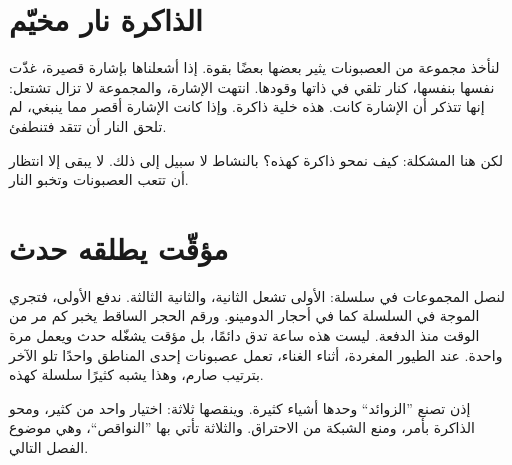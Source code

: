 \section*{الذاكرة نار مخيّم}

لنأخذ مجموعة من العصبونات يثير بعضها بعضًا بقوة. إذا أشعلناها بإشارة قصيرة، غذّت نفسها بنفسها، كنار تلقي في ذاتها وقودها. انتهت الإشارة، والمجموعة لا تزال تشتعل: إنها تتذكر أن الإشارة كانت. هذه خلية ذاكرة. وإذا كانت الإشارة أقصر مما ينبغي، لم تلحق النار أن تتقد فتنطفئ.

لكن هنا المشكلة: كيف نمحو ذاكرة كهذه؟ بالنشاط لا سبيل إلى ذلك. لا يبقى إلا انتظار أن تتعب العصبونات وتخبو النار.

\section*{مؤقّت يطلقه حدث}

لنصل المجموعات في سلسلة: الأولى تشعل الثانية، والثانية الثالثة. ندفع الأولى، فتجري الموجة في السلسلة كما في أحجار الدومينو. ورقم الحجر الساقط يخبر كم مر من الوقت منذ الدفعة. ليست هذه ساعة تدق دائمًا، بل مؤقت يشغّله حدث ويعمل مرة واحدة. عند الطيور المغردة، أثناء الغناء، تعمل عصبونات إحدى المناطق واحدًا تلو الآخر بترتيب صارم، وهذا يشبه كثيرًا سلسلة كهذه.

إذن تصنع ”الزوائد“ وحدها أشياء كثيرة. وينقصها ثلاثة: اختيار واحد من كثير، ومحو الذاكرة بأمر، ومنع الشبكة من الاحتراق. والثلاثة تأتي بها ”النواقص“، وهي موضوع الفصل التالي.

